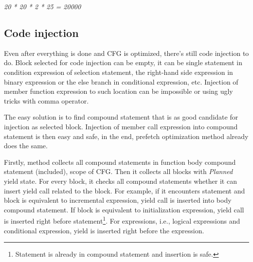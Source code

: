 \begin{center}
\emph{20 * 20 * 2 * 25 = 20000}
\end{center}

\subsection{Code injection}
Even after everything is done and CFG is optimized, there's still code injection to do. Block selected for code injection can be empty, it can be single statement in condition expression of selection statement, the right-hand side expression in binary expression or the else branch in conditional expression, etc. Injection of member function expression to such location can be impossible or using ugly tricks with comma operator.

The easy solution is to find compound statement that is as good candidate for injection as selected block. Injection of member call expression into compound statement is then easy and safe, in the end, prefetch optimization method already does the same.

Firstly, method collects all compound statements in function body compound statement (included), scope of CFG. Then it collects all blocks with \emph{Planned} yield state. For every block, it checks all compound statements whether it can insert yield call related to the block. For example, if it encounters  statement and block is equivalent to incremental expression, yield call is inserted into body compound statement. If block is equivalent to initialization expression, yield call is inserted right before  statement\footnote{Statement is already in compound statement and insertion is safe.}. For expressions, i.e., logical expressions and conditional expression, yield is inserted right before the expression.

